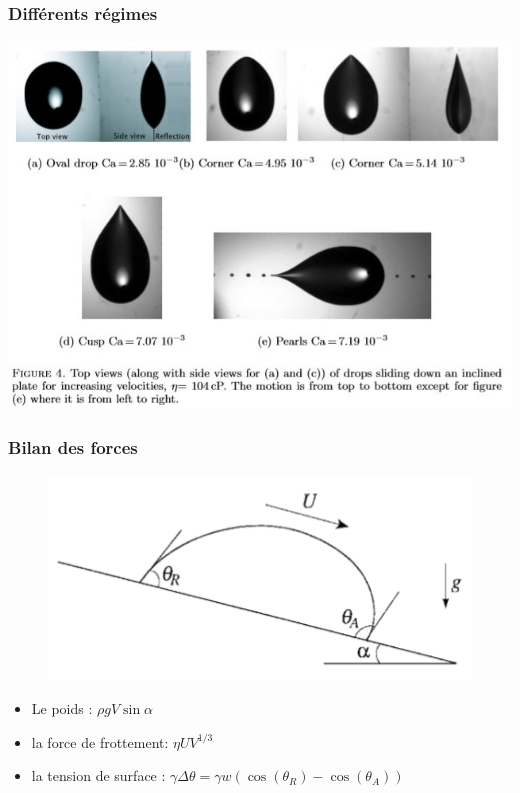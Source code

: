 \documentclass{beamer}
\begin{document}
\begin{frame}
\frametitle{Différents régimes}
\begin{center}
\includegraphics[scale = 0.5]{ovale_pointue.jpg}
\end{center}
\end{frame}

\begin{frame}
\frametitle{Bilan des forces}

\begin{figure}[t]
\centering
\includegraphics[scale = 0.3]{Bilan.png}
\end{figure}
\begin{itemize}
	\item Le poids : $\rho g V \sin \alpha$
	\item la force de frottement: $\eta U V^{1/3}$
	\item la tension de surface : $\gamma \Delta \theta = \gamma w \left( \cos (\theta_{R}) - \cos (\theta_{A}) \right)$
\end{itemize}
\end{frame}
\end{document}
